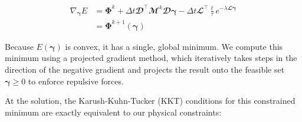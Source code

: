 \documentclass[conference]{IEEEtran}
\begin{document}
\begin{equation}
    \begin{split}
        \nabla_{\boldsymbol{\gamma}} E & = \boldsymbol{\Phi}^k + \Delta t \mathbfcal{D}^\top \mathbfcal{M}^k \mathbfcal{D} \boldsymbol{\gamma} - \Delta t \mathbfcal{L}^\top \frac{\boldsymbol{\ell}}{\tau} e^{-\lambda \mathbfcal{L} \boldsymbol{\gamma}} \\
        & = \boldsymbol{\Phi}^{k+1}(\boldsymbol{\gamma})
    \end{split}
\end{equation}

Because $E(\boldsymbol{\gamma})$ is convex, it has a single, global minimum. We compute this minimum using a projected gradient method, which iteratively takes steps in the direction of the negative gradient and projects the result onto the feasible set $\boldsymbol{\gamma} \geq 0$ to enforce repulsive forces.

At the solution, the Karush-Kuhn-Tucker (KKT) conditions for this constrained minimum are exactly equivalent to our physical constraints:
\end{document}

